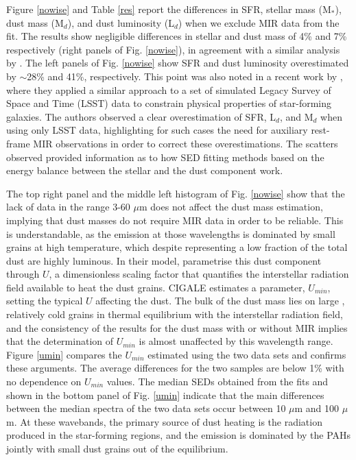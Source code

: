 \documentclass{aa}
\begin{document}
Figure \ref{nowise} and Table \ref{res} report the differences in SFR, stellar mass (M$_\ast$), dust mass (M$_d$), and dust luminosity (L$_d$) when we exclude MIR data from the fit. The results show negligible differences in stellar and dust mass of 4\% and 7\%  respectively (right panels of Fig. \ref{nowise}), in agreement with a similar analysis by \cite{pap2}. The left panels of Fig. \ref{nowise} show SFR and dust luminosity overestimated by $\sim$28\% and 41\%, respectively. This point was also noted in a recent work by \cite{ric}, where they applied a similar approach to a set of simulated Legacy Survey of Space and Time (LSST) data to constrain physical properties of star-forming galaxies. The authors observed a clear overestimation of SFR, L$_d$, and M$_d$ when using only LSST data, highlighting for such cases the need for auxiliary rest-frame MIR observations in order to correct these overestimations. The scatters observed provided information as to how SED fitting methods based on the energy balance between the stellar and the dust component work. 

The top right panel and the middle left histogram of Fig. \ref{nowise} show that the lack of data in the range 3-60 $\mu$m does not affect the dust mass estimation, implying that dust masses do not require MIR data in order to be reliable. This is understandable, as the emission at those wavelengths is dominated by small grains at high temperature, which despite representing a low fraction of the total dust are highly luminous. In their model, \cite{dra} parametrise this dust component through $U$, a dimensionless scaling factor that quantifies the interstellar radiation field available to heat the dust grains. CIGALE estimates a parameter, $U_{min}$, setting the typical $U$ affecting the dust. The bulk of the dust mass lies on large \citep[sub-micron sized,][]{li},
 relatively cold grains  in thermal equilibrium with the interstellar radiation field, and the consistency of the results for the dust mass with or without MIR implies that the determination of $U_{min}$ is almost unaffected by this wavelength range. Figure \ref{umin} compares the $U_{min}$ estimated using the two data sets and confirms these arguments. The average differences for the two samples are below 1\% with no dependence on $U_{min}$ values. The median SEDs obtained from the fits and shown in the bottom panel of Fig. \ref{umin} indicate that the main differences between the median spectra of the two data sets occur between 10 $\mu$m and 100 $\mu$m. At these wavebands, the primary source of dust heating is the radiation produced in the star-forming regions, and the emission is dominated by the PAHs jointly with small dust grains out of the equilibrium.
\end{document}
